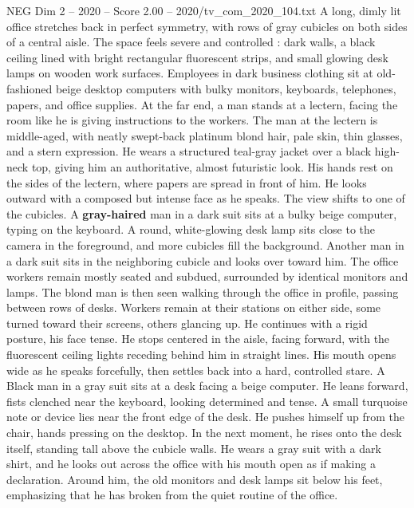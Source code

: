 \begin{textsample}{NEG Dim 2 – 2020 – Score 2.00 – 2020/tv\_com\_2020\_104.txt}  \label{ex:f2_neg_060}
A long, dimly lit office stretches back in perfect symmetry, with rows of gray cubicles on both sides of a central aisle.
The space feels severe and controlled : dark walls, a black ceiling lined with bright rectangular fluorescent strips, and small glowing desk lamps on wooden work surfaces.
Employees in dark business clothing sit at old-fashioned beige desktop computers with bulky monitors, keyboards, telephones, papers, and office supplies.
At the far end, a man stands at a lectern, facing the room like he is giving instructions to the workers.
The man at the lectern is middle-aged, with neatly swept-back platinum blond hair, pale skin, thin glasses, and a stern expression.
He wears a structured teal-gray jacket over a black high-neck top, giving him an authoritative, almost futuristic look.
His hands rest on the sides of the lectern, where papers are spread in front of him.
He looks outward with a composed but intense face as he speaks.
The view shifts to one of the cubicles.
A \textbf{gray-haired} man in a dark suit sits at a bulky beige computer, typing on the keyboard.
A round, white-glowing desk lamp sits close to the camera in the foreground, and more cubicles fill the background.
Another man in a dark suit sits in the neighboring cubicle and looks over toward him.
The office workers remain mostly seated and subdued, surrounded by identical monitors and lamps.
The blond man is then seen walking through the office in profile, passing between rows of desks.
Workers remain at their stations on either side, some turned toward their screens, others glancing up.
He continues with a rigid posture, his face tense.
He stops centered in the aisle, facing forward, with the fluorescent ceiling lights receding behind him in straight lines.
His mouth opens wide as he speaks forcefully, then settles back into a hard, controlled stare.
A Black man in a gray suit sits at a desk facing a beige computer.
He leans forward, fists clenched near the keyboard, looking determined and tense.
A small turquoise note or device lies near the front edge of the desk.
He pushes himself up from the chair, hands pressing on the desktop.
In the next moment, he rises onto the desk itself, standing tall above the cubicle walls.
He wears a gray suit with a dark shirt, and he looks out across the office with his mouth open as if making a declaration.
Around him, the old monitors and desk lamps sit below his feet, emphasizing that he has broken from the quiet routine of the office.

\end{textsample}
